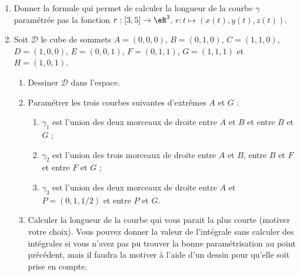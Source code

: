 \begin{exercice}\label{exoGeomAnal-0019}

  \begin{enumerate}
  \item  Donner la  formule qui permet de calculer la longueur de la courbe $\gamma$ paramétrée pas la fonction $r: [3,5]\to \eR^3$, $r: t \mapsto (x(t), y(t), z(t))$.   
\item Soit $\mathcal{D}$ le cube de sommets $A=(0,0,0)$, $B=(0,1,0)$, $C=(1,1,0)$, $D=(1,0,0)$, $E=(0,0,1)$, $F=(0,1,1)$, $G=(1,1,1)$ et $H=(1,0,1)$. 
\begin{enumerate}
\item Dessiner $\mathcal{D}$ dans l'espace. 
\item Paramétrer les trois courbes suivantes d'extrêmes $A$ et $G$ :
  \begin{enumerate}
  \item $\gamma_1$ est l'union des deux morceaux de droite entre $A$ et $B$ et entre $B$ et $G$ ;
  \item $\gamma_2$ est l'union des trois morceaux de droite entre $A$ et $B$, entre $B$ et $F$ et entre $F$ et $G$ ;
  \item $\gamma_3$ est l'union des deux morceaux de droite entre $A$ et $P=(0,1,1/2)$ et entre $P$ et $G$.
  \end{enumerate}
\item Calculer la longueur de la courbe qui vous parait la plus courte (motiver votre choix). Vous pouvez donner la valeur de l'intégrale sans calculer des intégrales si vous n'avez pas pu trouver la bonne paramétrisation au point précédent, mais il faudra la motiver à l'aide d'un dessin pour qu'elle soit prise en compte.

\end{enumerate}

  \end{enumerate}

\end{exercice}
